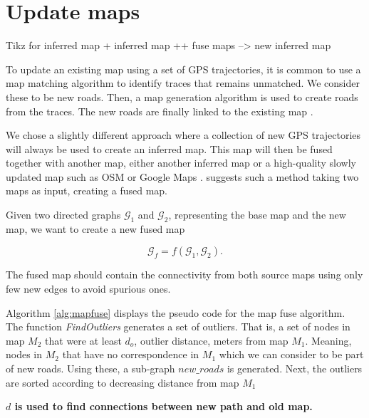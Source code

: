\newpage
\section{Update maps}
\label{chp:method.sec:fuse}

Tikz for inferred map + inferred map ++ fuse maps --> new inferred map


To update an existing map using a set of \ac{GPS} trajectories, it is common to use a map matching algorithm to identify traces that remains unmatched. We consider these to be new roads. Then, a map generation algorithm is used to create roads from the traces. The new roads are finally linked to the existing map \citep{crowdatlas}\citep{cobweb}.

We chose a slightly different approach where a collection of new \ac{GPS} trajectories will always be used to create an inferred map. This map will then be fused together with another map, either another inferred map or a high-quality slowly updated map such as \ac{OSM} \cite{osm} or Google Maps \cite{googlemaps}. \cite{fuse} suggests such a method taking two maps as input, creating a fused map.

Given two directed graphs $\mathcal{G}_1$ and $\mathcal{G}_2$, representing the base map and the new map, we want to create a new fused map

\begin{equation}
    \mathcal{G}_f = f(\mathcal{G}_1, \mathcal{G}_2). 
\end{equation}

The fused map should contain the connectivity from both source maps using only few new edges to avoid spurious ones. 


Algorithm \ref{alg:mapfuse} displays the pseudo code for the map fuse algorithm. The function \textit{FindOutliers} generates a set of outliers. That is, a set of nodes in map $M_2$ that were at least $d_o$, outlier distance, meters from map $M_1$. Meaning, nodes in $M_2$ that have no correspondence in $M_1$ which we can consider to be part of new roads. Using these, a sub-graph $\textit{new_roads}$ is generated. Next, the outliers are sorted according to decreasing distance from map $M_1$





\textbf{$d$ is used to find connections between new path and old map.}

